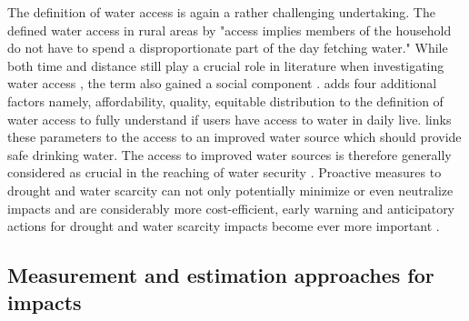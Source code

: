 The definition of water access is again a rather challenging undertaking. The \autocite[254]{worldbankWorldDevelopmentReport1997} defined water access in rural areas by "access implies members of the household do not have to spend a disproportionate part of the day fetching water." While both time and distance still play a crucial role in literature when investigating water access \autocite{cassiviDrinkingWaterAccessibility2019,cassiviEvaluatingSelfreportedMeasures2021,emenikeAccessingSafeDrinking2017}, the term also gained a social component \autocite{emenikeAccessingSafeDrinking2017,mitlinUnaffordableUndrinkable}. \autocite{obeng-odoomAccessWater2012} adds four additional factors namely, affordability, quality, equitable distribution to the definition of water access to fully understand if users have access to water in daily live. \autocite{unitednations/developmentprogrammeDeepeningDemocracyFragmented2002} links these parameters to the access to an improved water source which should provide safe drinking water.
The access to improved water sources is therefore generally considered as crucial in the reaching of water security \autocite{cdcAssessingAccessWater2022}. Proactive measures to drought and water scarcity can not only potentially minimize or even neutralize impacts and are considerably more cost-efficient, early warning and anticipatory actions for drought and water scarcity impacts become ever more important \autocite{faoandun-waterProgressLevelWater2021,idmpDroughtWaterScarcity2022,worldbankHighDryClimate2016}.


\subsection{Measurement and estimation approaches for impacts}\label{subsec:indicators} %

